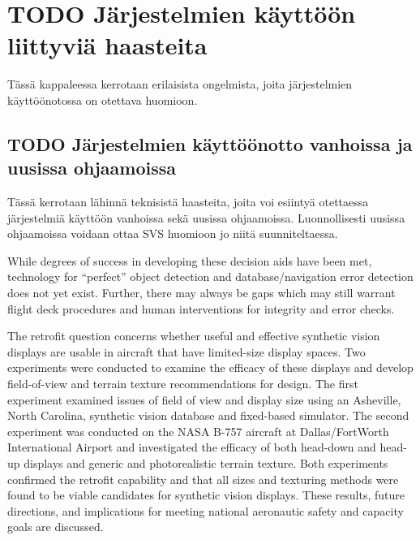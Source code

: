 \documentclass[utf8,bachelor,manualbib]{gradu3}
\begin{document}
\chapter{TODO Järjestelmien käyttöön liittyviä haasteita}

Tässä kappaleessa kerrotaan erilaisista ongelmista, joita järjestelmien käyttöönotossa on otettava huomioon.

\section{TODO Järjestelmien käyttöönotto vanhoissa ja uusissa ohjaamoissa}

Tässä kerrotaan lähinnä teknisistä haasteita, joita voi esiintyä otettaessa järjestelmiä käyttöön vanhoissa sekä uusissa ohjaamoissa. Luonnollisesti uusissa ohjaamoissa voidaan ottaa SVS huomioon jo niitä suunniteltaessa.

While degrees of success in developing these decision aids have been met, technology for “perfect” object detection and database/navigation error detection does not yet exist. Further, there may always be gaps which may still warrant flight deck procedures and human interventions for integrity and error checks.
\citep{baileyym2007}


The retrofit question concerns whether useful and effective synthetic vision displays
are usable in aircraft that have limited-size display spaces. Two experiments were
conducted to examine the efficacy of these displays and develop field-of-view and
terrain texture recommendations for design. The first experiment examined issues of
field of view and display size using an Asheville, North Carolina, synthetic vision database
and fixed-based simulator. The second experiment was conducted on the
NASA B-757 aircraft at Dallas/FortWorth International Airport and investigated the
efficacy of both head-down and head-up displays and generic and photorealistic terrain
texture. Both experiments confirmed the retrofit capability and that all sizes and
texturing methods were found to be viable candidates for synthetic vision displays.
These results, future directions, and implications for meeting national aeronautic
safety and capacity goals are discussed. \citep{prinzel2004}
\end{document}
